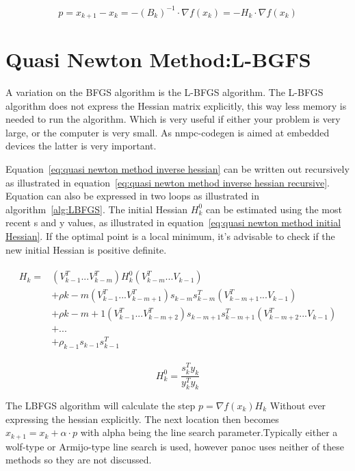 		\begin{equation}
		p = x_{k+1}-x_k = -(B_k)^{-1} \cdot \nabla f(x_k) = -H_k\cdot \nabla f(x_k)
		\label{eq:quasi newton method}	
		\end{equation}
		
	\section{Quasi Newton Method:L-BGFS}
	A variation on the BFGS algorithm is the L-BFGS algorithm. The L-BFGS algorithm does not express the Hessian matrix explicitly, this way less memory is needed to run the algorithm. Which is very useful if either your problem is very large, or the computer is very small. As nmpc-codegen is aimed at embedded devices the latter is very important.
	
	Equation~\ref{eq:quasi newton method inverse hessian} can be written out recursively as illustrated in equation~\ref{eq:quasi newton method inverse hessian recursive}. Equation can also be expressed in two loops as illustrated in algorithm~\ref{alg:LBFGS}. The initial Hessian $H^0_k$ can be estimated using the most recent s and y values, as illustrated in equation~\ref{eq:quasi newton method initial Hessian}. If the optimal point is a local minimum, it's advisable to check if the new initial Hessian is positive definite.
	
		\begin{eqnarray}	 
			\begin{aligned}
				H_k = 
				& (V^T_{k-1} ... V^T_{k-m})H^0_k(V^T_{k-m} ... V_{k-1}) \\
				& + \rho{k-m} (V^T_{k-1} ... V^T_{k-m+1})s_{k-m}s_{k-m}^T(V^T_{k-m+1} ... V_{k-1}) \\
				& + \rho{k-m+1} (V^T_{k-1} ... V^T_{k-m+2})s_{k-m+1}s_{k-m+1}^T(V^T_{k-m+2} ... V_{k-1}) \\
				& + ... \\
				& + \rho_{k-1}s_{k-1}s_{k-1}^T
			\end{aligned}
			\label{eq:quasi newton method inverse hessian recursive}
		\end{eqnarray}
		
		\begin{equation}
			H_k^0 = \frac{s_k^Ty_k}{y_k^Ty_k}
			\label{eq:quasi newton method initial Hessian}
		\end{equation}
	
	The LBFGS  algorithm will calculate the step $p = \nabla f(x_k) H_k$ Without ever expressing the hessian  explicitly. The next location then becomes $x_{k+1} = x_{k}+ \alpha \cdot p$ with alpha being the line search parameter.Typically either a wolf-type or Armijo-type line search is used, however panoc uses neither of these methods so they are not discussed.
	

